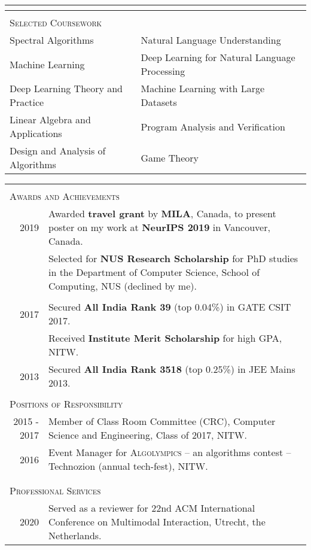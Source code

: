 \documentclass[a4paper,10pt]{article}
\begin{document}
\begin{tabularx}{\textwidth}{XX}
\multicolumn{2}{c}{}\\
\hline
\multicolumn{2}{c}{} \\
\multicolumn{2}{l}{\LARGE{\textsc{Selected Coursework}}}\\[2ex]

Spectral Algorithms & Natural Language Understanding\\
Machine Learning & Deep Learning for Natural Language Processing\\
Deep Learning Theory and Practice & Machine Learning with Large Datasets \\
Linear Algebra and Applications & Program Analysis and Verification \\
Design and Analysis of Algorithms & Game Theory\\
\end{tabularx}
\pagebreak
\begin{tabularx}{\textwidth}{r|X}
\hline
\multicolumn{2}{c}{}\\
\multicolumn{2}{l}{\LARGE{\textsc{Awards and Achievements}}}\\[2ex]
2019 & Awarded \textbf{travel grant} by \textbf{MILA}, Canada, to present poster on my work at \textbf{NeurIPS 2019} in Vancouver, Canada.\\[4ex]
& Selected for \textbf{NUS Research Scholarship} for PhD studies in the Department of Computer Science, School of Computing, NUS (declined by me).\\
\multicolumn{2}{c}{}\\
2017 & Secured \textbf{All India Rank 39} (top 0.04\%) in GATE CSIT 2017.\\[2ex]
& Received \textbf{Institute Merit Scholarship} for high GPA, NITW.\\[2ex]
2013 & Secured \textbf{All India Rank 3518} (top 0.25\%) in JEE Mains 2013. 

\multicolumn{2}{c}{}\\
\hline
\multicolumn{2}{c}{} \\
\multicolumn{2}{l}{\LARGE{\textsc{Positions of Responsibility}}}\\[2ex]
2015 - 2017 & Member of Class Room Committee (CRC), Computer Science and Engineering, Class of 2017, NITW.\\[4ex]
2016 & Event Manager for \textsc{Algolympics} -- an algorithms contest -- Technozion (annual tech-fest), NITW.\\

\multicolumn{2}{c}{}\\
\hline
\multicolumn{2}{c}{} \\
\multicolumn{2}{l}{\LARGE{\textsc{Professional Services}}}\\[2ex]
2020 & Served as a reviewer for 22nd ACM International Conference on Multimodal Interaction, Utrecht, the Netherlands.\\
\end{tabularx}
\end{document}
